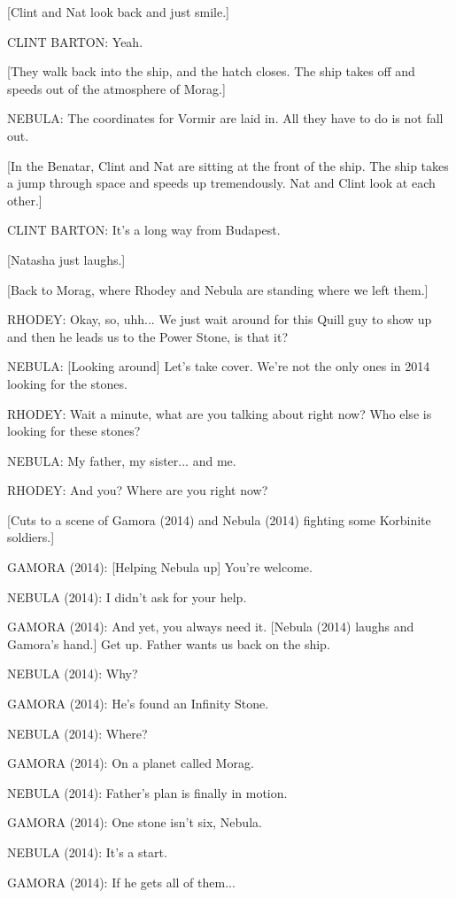 [Clint and Nat look back and just smile.]

CLINT BARTON: Yeah.

[They walk back into the ship, and the hatch closes. The ship takes off and speeds out of the atmosphere of Morag.]

NEBULA: The coordinates for Vormir are laid in. All they have to do is not fall out.

[In the Benatar, Clint and Nat are sitting at the front of the ship. The ship takes a jump through space and speeds up tremendously. Nat and Clint look at each other.]

CLINT BARTON: It's a long way from Budapest.

[Natasha just laughs.]

[Back to Morag, where Rhodey and Nebula are standing where we left them.]

RHODEY: Okay, so, uhh... We just wait around for this Quill guy to show up and then he leads us to the Power Stone, is that it?

NEBULA: [Looking around] Let's take cover. We're not the only ones in 2014 looking for the stones.

RHODEY: Wait a minute, what are you talking about right now? Who else is looking for these stones?

NEBULA: My father, my sister... and me.

RHODEY: And you? Where are you right now?

[Cuts to a scene of Gamora (2014) and Nebula (2014) fighting some Korbinite soldiers.]

GAMORA (2014): [Helping Nebula up] You're welcome.

NEBULA (2014): I didn't ask for your help.

GAMORA (2014): And yet, you always need it. [Nebula (2014) laughs and Gamora's hand.] Get up. Father wants us back on the ship.

NEBULA (2014): Why?

GAMORA (2014): He's found an Infinity Stone.

NEBULA (2014): Where?

GAMORA (2014): On a planet called Morag.

NEBULA (2014): Father's plan is finally in motion.

GAMORA (2014): One stone isn't six, Nebula.

NEBULA (2014): It’s a start.

GAMORA (2014): If he gets all of them...

